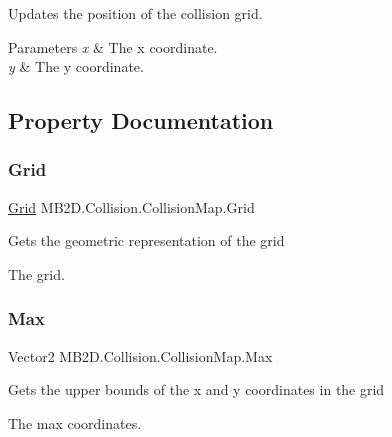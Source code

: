 Updates the position of the collision grid. 


\begin{DoxyParams}{Parameters}
{\em x} & The x coordinate.\\
\hline
{\em y} & The y coordinate.\\
\hline
\end{DoxyParams}


\subsection{Property Documentation}
\hypertarget{class_m_b2_d_1_1_collision_1_1_collision_map_aacfa35801f16fad4ea0d128edf522095}{}\label{class_m_b2_d_1_1_collision_1_1_collision_map_aacfa35801f16fad4ea0d128edf522095} 
\subsubsection{\texorpdfstring{Grid}{Grid}}
{\footnotesize\ttfamily \hyperlink{class_m_b2_d_1_1_geometry_1_1_grid}{Grid} M\+B2\+D.\+Collision.\+Collision\+Map.\+Grid\hspace{0.3cm}{\ttfamily [get]}}



Gets the geometric representation of the grid 

The grid.\hypertarget{class_m_b2_d_1_1_collision_1_1_collision_map_a707dab6ca65cfe316c248976a0d750f6}{}\label{class_m_b2_d_1_1_collision_1_1_collision_map_a707dab6ca65cfe316c248976a0d750f6} 
\subsubsection{\texorpdfstring{Max}{Max}}
{\footnotesize\ttfamily Vector2 M\+B2\+D.\+Collision.\+Collision\+Map.\+Max\hspace{0.3cm}{\ttfamily [get]}}



Gets the upper bounds of the x and y coordinates in the grid 

The max coordinates.\hypertarget{class_m_b2_d_1_1_collision_1_1_collision_map_a0d069be50f64db9f09d488dc2642ee48}{}\label{class_m_b2_d_1_1_collision_1_1_collision_map_a0d069be50f64db9f09d488dc2642ee48} 
